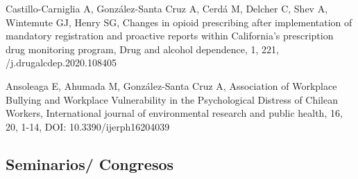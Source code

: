 \documentclass[11pt,a4paper,]{awesome-cv}
\begin{document}
\begin{cventries}
{\begin{cvitems}
\item Castillo-Carniglia A, González-Santa Cruz A, Cerdá M, Delcher C, Shev A, Wintemute GJ, Henry SG, Changes in opioid prescribing after implementation of mandatory registration and proactive reports within California's prescription drug monitoring program, Drug and alcohol dependence, 1, 221, /j.drugalcdep.2020.108405
\item Ansoleaga E, Ahumada M, González-Santa Cruz A, Association of Workplace Bullying and Workplace Vulnerability in the Psychological Distress of Chilean Workers, International journal of environmental research and public health, 16, 20, 1-14, DOI: 10.3390/ijerph16204039
\end{cvitems}}
\end{cventries}

\hypertarget{seminarios-congresos-1}{%
\subsection{Seminarios/ Congresos}\label{seminarios-congresos-1}}
\end{document}

